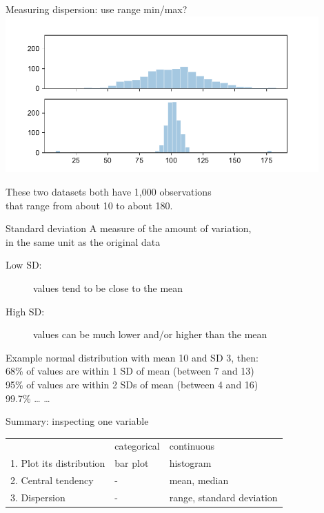 \documentclass{beamer}
\begin{document}
\begin{frame}{Measuring dispersion: use range min/max?}
\includegraphics[width=0.9\textwidth]{fig/disp}

These two datasets both have 1,000 observations \\
that range from about 10 to about 180.
\end{frame}


\begin{frame}{Standard deviation}
A measure of the amount of variation,\\
in the same unit as the original data

\begin{description}
    \item[Low SD:] values tend to be close to the mean
    \item[High SD:] values can be much lower and/or higher than the mean
\end{description}

\begin{block}{Example}
normal distribution with mean 10 and SD 3, then:\\
68\% of values are within 1 SD of mean (between 7 and 13) \\
95\% of values are within 2 SDs of mean (between 4 and 16) \\
99.7\% \dots
\dots
\end{block}
\end{frame}

\begin{frame}{Summary: inspecting one variable}
\begin{tabular}{lll}     & categorical & continuous \\
1. Plot its distribution & bar plot    & histogram \\
2. Central tendency      & -           & mean, median \\
3. Dispersion            & -           & range, standard deviation \\
\end{tabular}
\end{frame}
\end{document}
